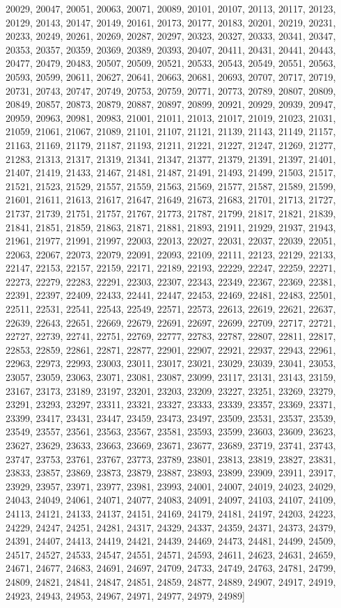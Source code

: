 \documentclass[10pt,twocolumn]{article}
\begin{document}
\begin{thebibliography}{9}
20029, 20047, 20051, 20063, 20071, 20089, 20101, 20107, 20113, 20117, 20123, 20129, 20143, 20147, 20149, 20161, 20173, 20177, 20183, 20201, 20219, 20231, 20233, 20249, 20261, 20269, 20287, 20297, 20323, 20327, 20333, 20341, 20347, 20353, 20357, 20359, 20369, 20389, 20393, 20407, 20411, 20431, 20441, 20443, 20477, 20479, 20483, 20507, 20509, 20521, 20533, 20543, 20549, 20551, 20563, 20593, 20599, 20611, 20627, 20641, 20663, 20681, 20693, 20707, 20717, 20719, 20731, 20743, 20747, 20749, 20753, 20759, 20771, 20773, 20789, 20807, 20809, 20849, 20857, 20873, 20879, 20887, 20897, 20899, 20921, 20929, 20939, 20947, 20959, 20963, 20981, 20983, 21001, 21011, 21013, 21017, 21019, 21023, 21031, 21059, 21061, 21067, 21089, 21101, 21107, 21121, 21139, 21143, 21149, 21157, 21163, 21169, 21179, 21187, 21193, 21211, 21221, 21227, 21247, 21269, 21277, 21283, 21313, 21317, 21319, 21341, 21347, 21377, 21379, 21391, 21397, 21401, 21407, 21419, 21433, 21467, 21481, 21487, 21491, 21493, 21499, 21503, 21517, 21521, 21523, 21529, 21557, 21559, 21563, 21569, 21577, 21587, 21589, 21599, 21601, 21611, 21613, 21617, 21647, 21649, 21673, 21683, 21701, 21713, 21727, 21737, 21739, 21751, 21757, 21767, 21773, 21787, 21799, 21817, 21821, 21839, 21841, 21851, 21859, 21863, 21871, 21881, 21893, 21911, 21929, 21937, 21943, 21961, 21977, 21991, 21997, 22003, 22013, 22027, 22031, 22037, 22039, 22051, 22063, 22067, 22073, 22079, 22091, 22093, 22109, 22111, 22123, 22129, 22133, 22147, 22153, 22157, 22159, 22171, 22189, 22193, 22229, 22247, 22259, 22271, 22273, 22279, 22283, 22291, 22303, 22307, 22343, 22349, 22367, 22369, 22381, 22391, 22397, 22409, 22433, 22441, 22447, 22453, 22469, 22481, 22483, 22501, 22511, 22531, 22541, 22543, 22549, 22571, 22573, 22613, 22619, 22621, 22637, 22639, 22643, 22651, 22669, 22679, 22691, 22697, 22699, 22709, 22717, 22721, 22727, 22739, 22741, 22751, 22769, 22777, 22783, 22787, 22807, 22811, 22817, 22853, 22859, 22861, 22871, 22877, 22901, 22907, 22921, 22937, 22943, 22961, 22963, 22973, 22993, 23003, 23011, 23017, 23021, 23029, 23039, 23041, 23053, 23057, 23059, 23063, 23071, 23081, 23087, 23099, 23117, 23131, 23143, 23159, 23167, 23173, 23189, 23197, 23201, 23203, 23209, 23227, 23251, 23269, 23279, 23291, 23293, 23297, 23311, 23321, 23327, 23333, 23339, 23357, 23369, 23371, 23399, 23417, 23431, 23447, 23459, 23473, 23497, 23509, 23531, 23537, 23539, 23549, 23557, 23561, 23563, 23567, 23581, 23593, 23599, 23603, 23609, 23623, 23627, 23629, 23633, 23663, 23669, 23671, 23677, 23689, 23719, 23741, 23743, 23747, 23753, 23761, 23767, 23773, 23789, 23801, 23813, 23819, 23827, 23831, 23833, 23857, 23869, 23873, 23879, 23887, 23893, 23899, 23909, 23911, 23917, 23929, 23957, 23971, 23977, 23981, 23993, 24001, 24007, 24019, 24023, 24029, 24043, 24049, 24061, 24071, 24077, 24083, 24091, 24097, 24103, 24107, 24109, 24113, 24121, 24133, 24137, 24151, 24169, 24179, 24181, 24197, 24203, 24223, 24229, 24247, 24251, 24281, 24317, 24329, 24337, 24359, 24371, 24373, 24379, 24391, 24407, 24413, 24419, 24421, 24439, 24469, 24473, 24481, 24499, 24509, 24517, 24527, 24533, 24547, 24551, 24571, 24593, 24611, 24623, 24631, 24659, 24671, 24677, 24683, 24691, 24697, 24709, 24733, 24749, 24763, 24781, 24799, 24809, 24821, 24841, 24847, 24851, 24859, 24877, 24889, 24907, 24917, 24919, 24923, 24943, 24953, 24967, 24971, 24977, 24979, 24989]

\end{thebibliography}
\end{document}
